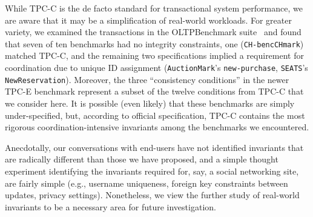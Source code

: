  While TPC-C is the de facto
standard for transactional system performance, we are aware that it
may be a simplification of real-world workloads. For greater variety,
we examined the transactions in the OLTPBenchmark
suite~\cite{oltpbench} and found that seven of ten benchmarks had no
integrity constraints, one (\texttt{CH-bencCHmark}) matched TPC-C, and
the remaining two specifications implied a requirement for
coordination due to unique ID assignment (\texttt{AuctionMark}'s
\texttt{new-purchase}, \texttt{SEATS}'s
\texttt{NewReservation}). Moreover, the three ``consistency
conditions'' in the newer TPC-E benchmark represent a subset of the
twelve conditions from TPC-C that we consider here. It is possible
(even likely) that these benchmarks are simply under-specified, but,
according to official specification, TPC-C contains the most rigorous
coordination-intensive invariants among the benchmarks we encountered.

Anecdotally, our conversations with end-users have not identified
invariants that are radically different than those we have proposed,
and a simple thought experiment identifying the invariants required
for, say, a social networking site, are fairly simple (e.g., username
uniqueness, foreign key constraints between updates, privacy
settings). Nonetheless, we view the further study of real-world
invariants to be a necessary area for future investigation.


